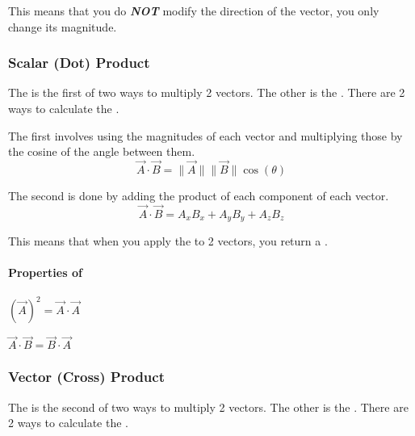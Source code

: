 This means that you do \emph{\textbf{NOT}} modify the direction of the vector, you only change its magnitude.

\subsubsection{Scalar (Dot) Product} \label{subsubsec:Dot Product}
The  is the first of two ways to multiply 2 vectors.
The other is the .
There are 2 ways to calculate the .

The first involves using the magnitudes of each vector and multiplying those by the cosine of the angle between them.
\begin{equation} \label{eq:Dot Product Magnitudes}
  \vec{A} \cdot \vec{B} = \lVert \vec{A} \rVert \lVert \vec{B} \rVert \cos \left( \theta \right)
\end{equation}

The second is done by adding the product of each component of each vector.
\begin{equation} \label{eq:Dot Product Components}
  \vec{A} \cdot \vec{B} = A_{x}B_{x} + A_{y}B_{y} + A_{z}B_{z}
\end{equation}

\begin{remark*}
  This means that when you apply the  to 2 vectors, you return a .
\end{remark*}

\paragraph{Properties of } \label{par:Dot Product Properties}
\begin{propertylist}
  \item $( \vec{A} )^{2} = \vec{A} \cdot \vec{A}$
  \item $\vec{A} \cdot \vec{B} = \vec{B} \cdot \vec{A}$
\end{propertylist}

\subsubsection{Vector (Cross) Product} \label{subsubsec:Cross Product}
The  is the second of two ways to multiply 2 vectors.
The other is the .
There are 2 ways to calculate the .

